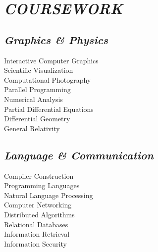 \documentclass[11pt]{article}
\begin{document}
\begin{minipage}{250pt}
\section*{\it COURSEWORK}
\subsection*{\it Graphics \& Physics}
Interactive Computer Graphics\\
Scientific Visualization\\
Computational Photography\\
Parallel Programming\\
Numerical Analysis\\
Partial Differential Equations\\
Differential Geometry\\
General Relativity

\subsection*{\it Language \& Communication}
Compiler Construction\\
Programming Languages\\
Natural Language Processing\\
Computer Networking\\
Distributed Algorithms\\
Relational Databases\\
Information Retrieval\\
Information Security

\end{minipage}
\end{document}
